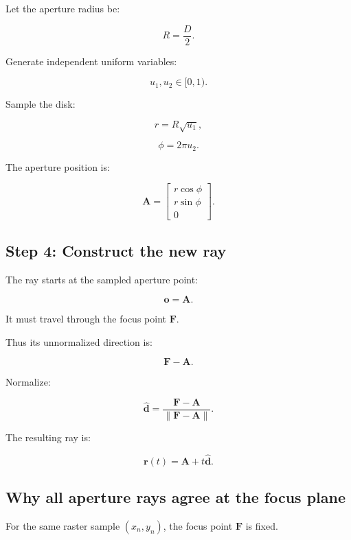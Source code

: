 \hypertarget{02-foundations-ii-ch036-step-3-sample-the-aperture}{}

Let the aperture radius be:

\[ R=\frac D2. \]

Generate independent uniform variables:

\[ u_1,u_2\in[0,1). \]

Sample the disk:

\[ r=R\sqrt{u_1}, \]

\[ \phi=2\pi u_2. \]

The aperture position is:

\[ \boxed{ \mathbf A= \begin{bmatrix} r\cos\phi\\ r\sin\phi\\ 0 \end{bmatrix}. } \]

\subsection{Step 4: Construct the new ray}\label{02-foundations-ii-ch036-step-4-construct-the-new-ray}

\hypertarget{02-foundations-ii-ch036-step-4-construct-the-new-ray}{}

The ray starts at the sampled aperture point:

\[ \boxed{ \mathbf o=\mathbf A. } \]

It must travel through the focus point \(\mathbf F\).

Thus its unnormalized direction is:

\[ \mathbf F-\mathbf A. \]

Normalize:

\[ \boxed{ \hat{\mathbf d} = \frac{\mathbf F-\mathbf A} {\|\mathbf F-\mathbf A\|}. } \]

The resulting ray is:

\[ \boxed{ \mathbf r(t)= \mathbf A+t\hat{\mathbf d}. } \]

\subsection{Why all aperture rays agree at the focus plane}\label{02-foundations-ii-ch036-why-all-aperture-rays-agree-at-the-focus-plane}

\hypertarget{02-foundations-ii-ch036-why-all-aperture-rays-agree-at-the-focus-plane}{}

For the same raster sample \((x_n,y_n)\), the focus point \(\mathbf F\) is fixed.

